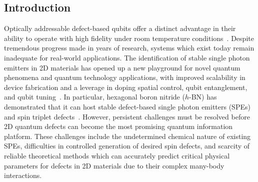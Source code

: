 \subsection{Introduction}
Optically addressable defect-based qubits offer a distinct advantage in their ability to operate with high fidelity under room temperature conditions~\cite{koehl2011room,weber2010quantum}.
Despite tremendous progress made in years of research, systems which exist today remain inadequate for real-world applications. The identification of stable single photon emitters in 2D materials has opened up a new playground for novel quantum phenomena and quantum technology applications, with improved scalability in device fabrication and
a leverage in doping spatial control, qubit entanglement, and qubit tuning~\cite{liu20192d,aharonovich2017quantum}.
In particular, hexagonal boron nitride ($h$-BN) has demonstrated that it can host stable defect-based single photon emitters (SPEs)~\cite{mendelson2020strain,feldman2019phonon,yim2020polarization,mackoit2019carbon} and spin triplet defects~\cite{kianinia2020generation,turiansky2020spinning}.
However,
persistent challenges must be resolved before 2D quantum defects can become the most promising quantum information platform. These challenges include the undetermined chemical nature of
existing SPEs\cite{li2017nonmagnetic,yim2020polarization}, difficulties in controlled generation of desired spin defects, and scarcity of reliable theoretical methods which
can accurately predict critical physical parameters for defects in 2D materials due to their complex many-body interactions.

